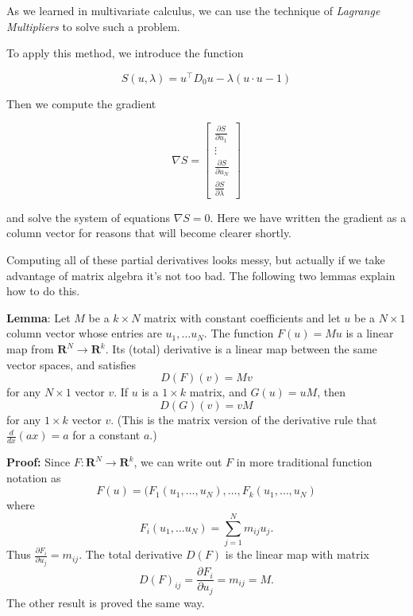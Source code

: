 \documentclass[
]{article}
\begin{document}
As we learned in multivariate calculus, we can use the technique of
\emph{Lagrange Multipliers} to solve such a problem.

To apply this method, we introduce the function

\begin{equation}
S(u, \lambda) = u^{\intercal}D_{0}u - \lambda(u\cdot u -1)
\label{eq:lagrange}\end{equation}

Then we compute the gradient

\begin{equation}
\nabla S = \left[\begin{matrix} \frac{\partial S}{\partial u_{1}} \\ \vdots \\ \frac{\partial S}{\partial u_{N}} \\ \frac{\partial S}{\partial \lambda}\end{matrix}\right]
\label{eq:lagrangegradient}\end{equation}

and solve the system of equations \(\nabla S=0\). Here we have written
the gradient as a column vector for reasons that will become clearer
shortly.

Computing all of these partial derivatives looks messy, but actually if
we take advantage of matrix algebra it's not too bad. The following two
lemmas explain how to do this.

\textbf{Lemma}: Let \(M\) be a \(k\times N\) matrix with constant
coefficients and let \(u\) be a \(N\times 1\) column vector whose
entries are \(u_1,\ldots u_{N}\). The function \(F(u) = Mu\) is a linear
map from \(\mathbf{R}^{N}\to\mathbf{R}^{k}\). Its (total) derivative is
a linear map between the same vector spaces, and satisfies \[
D(F)(v) = Mv
\] for any \(N\times 1\) vector \(v\). If \(u\) is a \(1\times k\)
matrix, and \(G(u) = uM\), then \[
D(G)(v) = vM
\] for any \(1\times k\) vector \(v\). (This is the matrix version of
the derivative rule that \(\frac{d}{dx}(ax)=a\) for a constant \(a\).)

\textbf{Proof:} Since \(F:\mathbf{R}^{N}\to\mathbf{R}^{k}\), we can
write out \(F\) in more traditional function notation as \[
F(u) = (F_{1}(u_1,\ldots, u_N), \ldots, F_{k}(u_1,\ldots, u_{N})
\] where \[
F_{i}(u_1,\ldots u_N) = \sum_{j=1}^{N} m_{ij}u_{j}.
\] Thus \(\frac{\partial F_{i}}{\partial u_{j}} = m_{ij}\). The total
derivative \(D(F)\) is the linear map with matrix \[
D(F)_{ij} = \frac{\partial F_{i}}{\partial u_{j}} = m_{ij} = M.
\] The other result is proved the same way.
\end{document}
